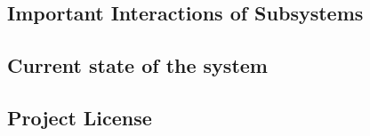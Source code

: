 



\subsection{Important Interactions of Subsystems}

\subsection{Current state of the system}

\subsection{Project License}